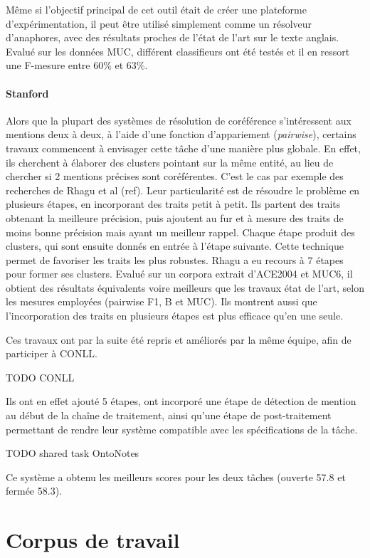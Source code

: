 \documentclass[a4paper,12pt]{article}
\begin{document}
Même si l'objectif principal de cet outil était de créer une plateforme d'expérimentation, il peut être utilisé simplement comme un résolveur d'anaphores, avec des résultats proches de l'état de l'art sur le texte anglais. Evalué sur les données MUC, différent classifieurs ont été testés et il en ressort une F-mesure entre 60\% et 63\%.

\paragraph{Stanford}
Alors que la plupart des systèmes de résolution de coréférence  s'intéressent aux mentions deux à deux, à l'aide d'une fonction d'\og appariement \fg{} (\textit{pairwise}), certains travaux commencent à envisager cette tâche d'une manière plus globale. En effet, ils cherchent à élaborer des clusters pointant sur la même entité, au lieu de chercher si 2 mentions précises sont coréférentes. C'est le cas par exemple des recherches de Rhagu et al (ref). Leur particularité est de résoudre le problème en plusieurs étapes, en incorporant des traits petit à petit. Ils partent des traits obtenant la meilleure précision, puis ajoutent au fur et à mesure des traits de moins bonne précision mais ayant un meilleur rappel. Chaque étape produit des clusters, qui sont ensuite donnés en entrée à l'étape suivante. Cette technique permet de favoriser les traits les plus robustes.
Rhagu a eu recours à 7 étapes pour former ses clusters. Evalué sur un corpora extrait d'ACE2004 et MUC6, il obtient des résultats équivalents voire meilleurs que les travaux état de l'art, selon les mesures employées (pairwise F1, B et MUC). Ils montrent aussi que l'incorporation des traits en plusieurs étapes est plus efficace qu'en une seule.

Ces travaux ont par la suite été repris et améliorés par la même équipe, afin de participer à CONLL.

TODO CONLL

Ils ont en effet ajouté 5 étapes, ont incorporé une étape de détection de mention au début de la chaîne de traitement, ainsi qu'une étape de post-traitement permettant de rendre leur système compatible avec les spécifications de la tâche.

TODO shared task OntoNotes

Ce système a obtenu les meilleurs scores pour les deux tâches (ouverte 57.8 et fermée 58.3).

\section{Corpus de travail}
\label{corpus}
\end{document}
